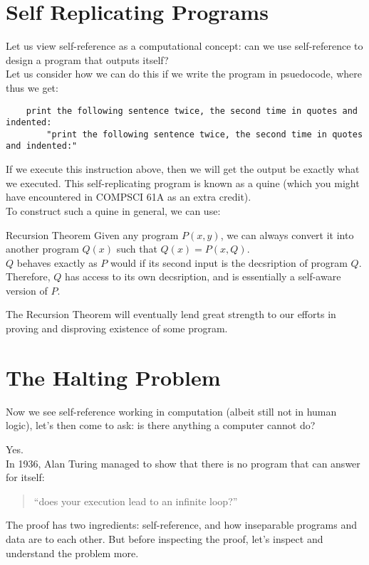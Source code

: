 \section{Self Replicating Programs}
Let us view self-reference as a computational concept: can we use self-reference to design a program that outputs itself? \\
Let us consider how we can do this if we write the program in psuedocode, where thus we get:
\begin{verbatim}
    print the following sentence twice, the second time in quotes and indented:
        "print the following sentence twice, the second time in quotes and indented:"
\end{verbatim}
If we execute this instruction above, then we will get the output be exactly what we executed. This self-replicating program is known as a quine (which you might have encountered in COMPSCI 61A as an extra credit). \\
To construct such a quine in general, we can use:
\begin{ln-theorem}{Recursion Theorem}{}
    Given any program $P(x, y)$, we can always convert it into another program $Q(x)$ such that $Q(x) = P(x, Q)$. \\
    $Q$ behaves exactly as $P$ would if its second input is the decsription of program $Q$. \\
    Therefore, $Q$ has access to its own decsription, and is essentially a self-aware version of $P$.
\end{ln-theorem}
The Recursion Theorem will eventually lend great strength to our efforts in proving and disproving existence of some program.

\section{The Halting Problem}
Now we see self-reference working in computation (albeit still not in human logic), let's then come to ask: is there anything a computer cannot do?

Yes. \\
In 1936, Alan Turing managed to show that there is no program that can answer for itself:
\begin{quote}
    ``does your execution lead to an infinite loop?''
\end{quote}
The proof has two ingredients: self-reference, and how inseparable programs and data are to each other. But before inspecting the proof, let's inspect and understand the problem more.

